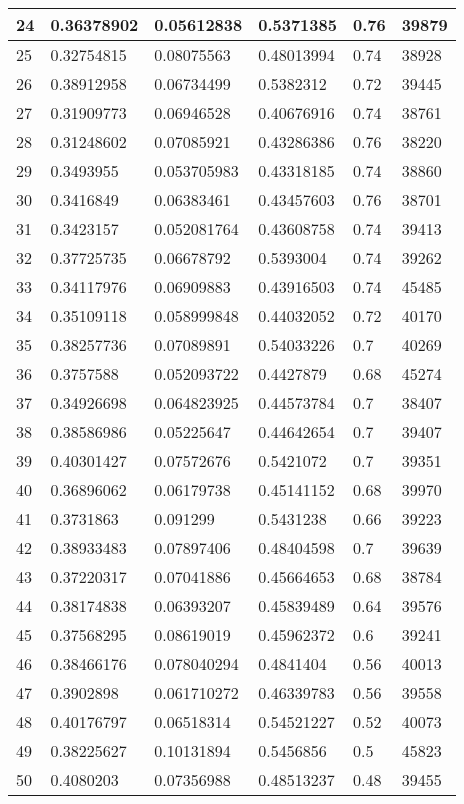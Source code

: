 \begin{longtable}{|l|l|l|l|l|l|}
24 & 0.36378902 & 0.05612838 & 0.5371385 & 0.76 & 39879 \\ \hline 
25 & 0.32754815 & 0.08075563 & 0.48013994 & 0.74 & 38928 \\ \hline 
26 & 0.38912958 & 0.06734499 & 0.5382312 & 0.72 & 39445 \\ \hline 
27 & 0.31909773 & 0.06946528 & 0.40676916 & 0.74 & 38761 \\ \hline 
28 & 0.31248602 & 0.07085921 & 0.43286386 & 0.76 & 38220 \\ \hline 
29 & 0.3493955 & 0.053705983 & 0.43318185 & 0.74 & 38860 \\ \hline 
30 & 0.3416849 & 0.06383461 & 0.43457603 & 0.76 & 38701 \\ \hline 
31 & 0.3423157 & 0.052081764 & 0.43608758 & 0.74 & 39413 \\ \hline 
32 & 0.37725735 & 0.06678792 & 0.5393004 & 0.74 & 39262 \\ \hline 
33 & 0.34117976 & 0.06909883 & 0.43916503 & 0.74 & 45485 \\ \hline 
34 & 0.35109118 & 0.058999848 & 0.44032052 & 0.72 & 40170 \\ \hline 
35 & 0.38257736 & 0.07089891 & 0.54033226 & 0.7 & 40269 \\ \hline 
36 & 0.3757588 & 0.052093722 & 0.4427879 & 0.68 & 45274 \\ \hline 
37 & 0.34926698 & 0.064823925 & 0.44573784 & 0.7 & 38407 \\ \hline 
38 & 0.38586986 & 0.05225647 & 0.44642654 & 0.7 & 39407 \\ \hline 
39 & 0.40301427 & 0.07572676 & 0.5421072 & 0.7 & 39351 \\ \hline 
40 & 0.36896062 & 0.06179738 & 0.45141152 & 0.68 & 39970 \\ \hline 
41 & 0.3731863 & 0.091299 & 0.5431238 & 0.66 & 39223 \\ \hline 
42 & 0.38933483 & 0.07897406 & 0.48404598 & 0.7 & 39639 \\ \hline 
43 & 0.37220317 & 0.07041886 & 0.45664653 & 0.68 & 38784 \\ \hline 
44 & 0.38174838 & 0.06393207 & 0.45839489 & 0.64 & 39576 \\ \hline 
45 & 0.37568295 & 0.08619019 & 0.45962372 & 0.6 & 39241 \\ \hline 
46 & 0.38466176 & 0.078040294 & 0.4841404 & 0.56 & 40013 \\ \hline 
47 & 0.3902898 & 0.061710272 & 0.46339783 & 0.56 & 39558 \\ \hline 
48 & 0.40176797 & 0.06518314 & 0.54521227 & 0.52 & 40073 \\ \hline 
49 & 0.38225627 & 0.10131894 & 0.5456856 & 0.5 & 45823 \\ \hline 
50 & 0.4080203 & 0.07356988 & 0.48513237 & 0.48 & 39455 \\ \hline 
\end{longtable}